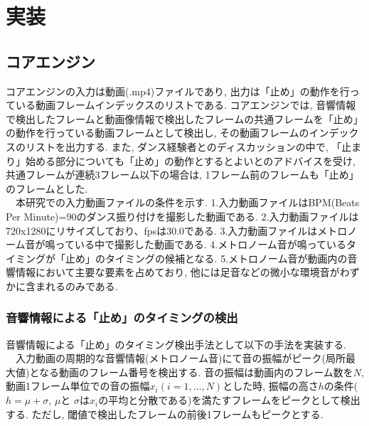 \documentclass[technicalreport]{ieicej}
\begin{document}
\section{実装}
\subsection{コアエンジン}
コアエンジンの入力は動画(.mp4)ファイルであり, 出力は「止め」の動作を行っている動画フレームインデックスのリストである. コアエンジンでは, 音響情報で検出したフレームと動画像情報で検出したフレームの共通フレームを「止め」の動作を行っている動画フレームとして検出し, その動画フレームのインデックスのリストを出力する. また, ダンス経験者とのディスカッションの中で, 「止まり」始める部分についても「止め」の動作とするとよいとのアドバイスを受け, 共通フレームが連続3フレーム以下の場合は, 1フレーム前のフレームも「止め」のフレームとした. \\
　本研究での入力動画ファイルの条件を示す. 1.入力動画ファイルはBPM(Beats Per Minute)=90のダンス振り付けを撮影した動画である. 2.入力動画ファイルは720x1280にリサイズしており、fpsは30.0である. 3.入力動画ファイルはメトロノーム音が鳴っている中で撮影した動画である. 4.メトロノーム音が鳴っているタイミングが「止め」のタイミングの候補となる. 5.メトロノーム音が動画内の音響情報において主要な要素を占めており, 他には足音などの微小な環境音がわずかに含まれるのみである. 
\subsubsection{音響情報による「止め」のタイミングの検出}
音響情報による「止め」のタイミング検出手法として以下の手法を実装する. \\
　入力動画の周期的な音響情報(メトロノーム音)にて音の振幅がピーク(局所最大値)となる動画のフレーム番号を検出する. 音の振幅は動画内のフレーム数を$N$, 動画1フレーム単位での音の振幅$x_i(i=1,\dots,N)$とした時, 振幅の高さ$h$の条件($h=\mu+\sigma$, $\mu$と $\sigma$は$x_i$の平均と分散である)を満たすフレームをピークとして検出する. ただし, 閾値で検出したフレームの前後1フレームもピークとする. 
\end{document}
